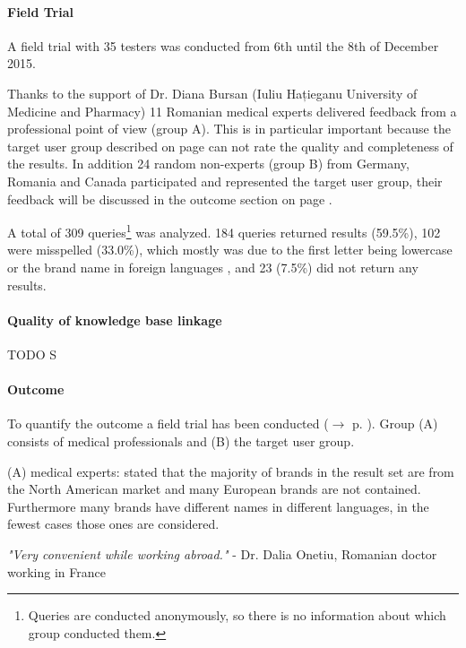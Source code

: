 \documentclass[11pt,titlepage,oneside,openany]{book}
\begin{document}
\paragraph{Field Trial}
\label{cha:field_trial}
\label{field_trial}
A field trial with 35 testers was conducted from 6th until the 8th of December 2015.

Thanks to the support of Dr. Diana Bursan (Iuliu Hațieganu University of Medicine and Pharmacy) 11 Romanian medical experts delivered feedback from a professional point of view (group A). This is in particular important because the target user group described on page \pageref{cha:domain} can not rate the quality and completeness of the results.
In addition 24 random non-experts (group B) from Germany, Romania and Canada participated and represented the target user group, their feedback will be discussed in the outcome section on page \pageref{outcome}. 

A total of 309 queries\footnote{Queries are conducted anonymously, so there is no information about which group conducted them.} was analyzed. 184 queries returned results (59.5\%), 102 were misspelled (33.0\%), which mostly was due to the first letter being lowercase or the brand name in foreign languages , and 23 (7.5\%) did not return any results.  

\paragraph{Quality of knowledge base linkage}
\label{cha:example}

TODO S

\paragraph{Outcome}
\label{outcome}
To quantify the outcome a field trial has been conducted ($\rightarrow$ p. \pageref{cha:field_trial}). Group (A) consists of medical professionals and (B) the target user group.

(A) medical experts: stated that the majority of brands in the result set are from the North American market and many European brands are not contained. Furthermore many brands have different names in different languages, in the fewest cases those ones are considered.

\begin{center}
\textit{"Very convenient while working abroad."}\linebreak
- Dr. Dalia Onetiu, Romanian doctor working in France
\end{center}
\end{document}
